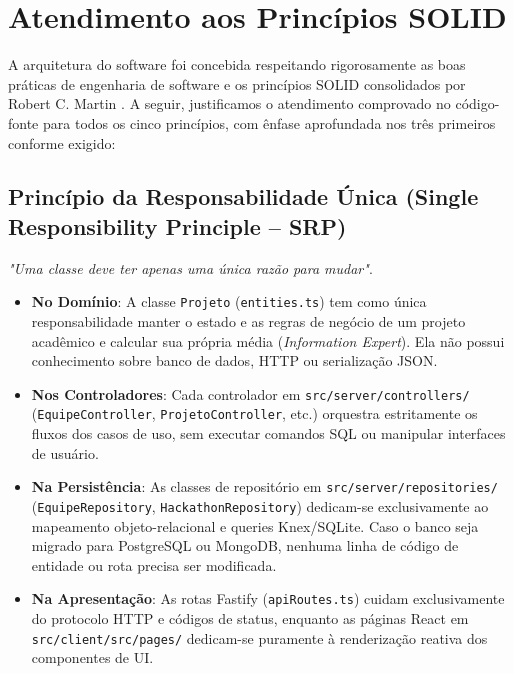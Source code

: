 \documentclass[12pt]{article}
\begin{document}
\section{Atendimento aos Princípios SOLID}

A arquitetura do software foi concebida respeitando rigorosamente as boas práticas de engenharia de software e os princípios SOLID consolidados por Robert C. Martin \cite{martin2002}. A seguir, justificamos o atendimento comprovado no código-fonte para todos os cinco princípios, com ênfase aprofundada nos três primeiros conforme exigido:

\subsection{Princípio da Responsabilidade Única (Single Responsibility Principle -- SRP)}
\textit{"Uma classe deve ter apenas uma única razão para mudar"}.
\begin{itemize}
    \item \textbf{No Domínio}: A classe \texttt{Projeto} (\texttt{entities.ts}) tem como única responsabilidade manter o estado e as regras de negócio de um projeto acadêmico e calcular sua própria média (\textit{Information Expert}). Ela não possui conhecimento sobre banco de dados, HTTP ou serialização JSON.
    \item \textbf{Nos Controladores}: Cada controlador em \texttt{src/server/controllers/} (\texttt{EquipeController}, \texttt{ProjetoController}, etc.) orquestra estritamente os fluxos dos casos de uso, sem executar comandos SQL ou manipular interfaces de usuário.
    \item \textbf{Na Persistência}: As classes de repositório em \texttt{src/server/repositories/} (\texttt{EquipeRepository}, \texttt{HackathonRepository}) dedicam-se exclusivamente ao mapeamento objeto-relacional e queries Knex/SQLite. Caso o banco seja migrado para PostgreSQL ou MongoDB, nenhuma linha de código de entidade ou rota precisa ser modificada.
    \item \textbf{Na Apresentação}: As rotas Fastify (\texttt{apiRoutes.ts}) cuidam exclusivamente do protocolo HTTP e códigos de status, enquanto as páginas React em \texttt{src/client/src/pages/} dedicam-se puramente à renderização reativa dos componentes de UI.
\end{itemize}
\end{document}

